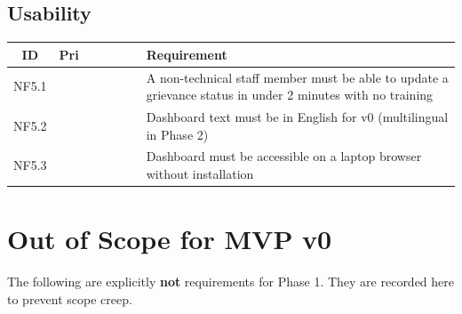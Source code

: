 \documentclass[11pt, a4paper]{article}
\newcommand{\must}{\textcolor{white}{\colorbox{mustcol}{\textbf{\ MUST\ }}}}
\newcommand{\should}{\textcolor{white}{\colorbox{shouldcol}{\textbf{\ SHOULD\ }}}}
\begin{document}
\subsection{Usability}

\begin{tabularx}{\linewidth}{clX}
\toprule
\textbf{ID} & \textbf{Pri} & \textbf{Requirement} \\
\midrule
NF5.1 & \must   & A non-technical staff member must be able to update a grievance status in under 2 minutes with no training \\
NF5.2 & \should & Dashboard text must be in English for v0 (multilingual in Phase 2) \\
NF5.3 & \should & Dashboard must be accessible on a laptop browser without installation \\
\bottomrule
\end{tabularx}

\newpage

\section{Out of Scope for MVP v0}

The following are explicitly \textbf{not} requirements for Phase 1. They are recorded here to prevent scope creep.
\end{document}
